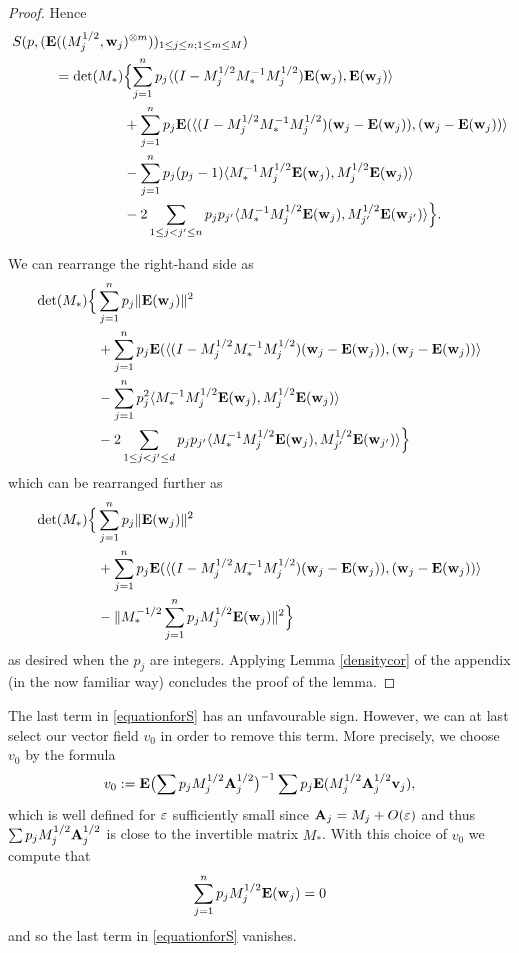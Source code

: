 \begin{proof}
Hence
\begin{eqnarray*}
\begin{aligned}
S(p, ({\hbox{\bf E}}( (M_j^{1/2}, {\hbox{\bf w}}_j&)^{\otimes m} ))_{1 \leq j
\leq n; 1 \leq m \leq M} )\\
= \det (M_*) &\Bigl\{ \sum_{j=1}^n p_j\langle
(I-M_j^{1/2}M_{*}^{-1}M_{j}^{1/2}) {\hbox{\bf E}}({\hbox{\bf w}}_j), {\hbox{\bf E}}({\hbox{\bf w}}_j)
\rangle\\
&+ \sum_{j=1}^n p_j {\hbox{\bf E}}(\langle (I-M_j^{1/2} M_* ^{-1}
M_j^{1/2})({\hbox{\bf w}}_j - {\hbox{\bf E}}({\hbox{\bf w}}_j)),
({\hbox{\bf w}}_j - {\hbox{\bf E}}({\hbox{\bf w}}_j)) \rangle\\
&-\sum_{j=1}^{n}p_{j}(p_{j}-1)\langle M_*^{-1}M_j^{1/2}{\hbox{\bf E}}({\hbox{\bf w}}_j), M_j^{1/2} {\hbox{\bf E}}({\hbox{\bf w}}_j) \rangle\\
&- 2\sum_{1 \leq j < j' \leq n} p_{j}p_{j'}\langle
M_*^{-1}M_j^{1/2}{\hbox{\bf E}}({\hbox{\bf w}}_j),
M_{j'}^{1/2} {\hbox{\bf E}}({\hbox{\bf w}}_{j'}) \rangle\Bigr\}.
\end{aligned}
\end{eqnarray*}

We can rearrange the right-hand side as
\begin{eqnarray*}
\begin{aligned}
\det (M_*) \Bigl\{&\sum_{j=1}^n p_{j}\|{\hbox{\bf E}}({\hbox{\bf w}}_j)\|^2 \\&+
\sum_{j=1}^n p_j {\hbox{\bf E}}(\langle (I-M_j^{1/2} M_* ^{-1} M_j^{1/2})
({\hbox{\bf w}}_j - {\hbox{\bf E}}({\hbox{\bf w}}_j)),
({\hbox{\bf w}}_j - {\hbox{\bf E}}({\hbox{\bf w}}_j)) \rangle\\
&-\sum_{j=1}^{n}p_{j}^2\langle M_*^{-1}M_j^{1/2} {\hbox{\bf E}}({\hbox{\bf w}}_j),
M_j^{1/2}{\hbox{\bf E}}({\hbox{\bf w}}_j)
\rangle\\
&- 2\sum_{1 \leq j < j' \leq d} p_{j}p_{j'}\langle
M_*^{-1}M_j^{1/2}{\hbox{\bf E}}({\hbox{\bf w}}_j),
M_{j'}^{1/2} {\hbox{\bf E}}({\hbox{\bf w}}_{j'}) \rangle \Bigr\}
\end{aligned}
\end{eqnarray*}
which can be rearranged further as
\begin{align*}
\det (M_*) \Bigl\{&\sum_{j=1}^n p_{j}\|{\hbox{\bf E}}({\hbox{\bf w}}_j)\|^2 \\&+
\sum_{j=1}^n p_j {\hbox{\bf E}}(\langle (I-M_j^{1/2} M_* ^{-1} M_j^{1/2})({\hbox{\bf w}}_j
- {\hbox{\bf E}}({\hbox{\bf w}}_j)),
({\hbox{\bf w}}_j - {\hbox{\bf E}}({\hbox{\bf w}}_j)) \rangle\\
&-\| M_*^{-1/2}\sum_{j=1}^n p_{j}M_j^{1/2} {\hbox{\bf E}}({\hbox{\bf w}}_j) \|^2 \Bigr\}
\end{align*}
as desired when the $p_j$ are integers. Applying Lemma
\ref{densitycor} of the appendix (in the now familiar way)
concludes the proof of the lemma.
\end{proof}

The last term in \eqref{equationforS} has an unfavourable sign.
However, we can at last select our vector field $v_0$ in order to remove this term.
More precisely, we choose $v_0$ by the formula
$$v_{0} := {\hbox{\bf E}}\bigl(\sum p_jM_j^{1/2}{\hbox{\bf A}}_{j}^{1/2}\bigr)^{-1}
\sum p_{j}{\hbox{\bf E}}(M_{j}^{1/2}{\hbox{\bf A}}_{j}^{1/2}{\hbox{\bf v}}_{j}),$$
which is well defined for $\varepsilon$ sufficiently small since ${\hbox{\bf A}}_j = M_j + O(\varepsilon)$ and
thus $\sum p_jM_j^{1/2}{\hbox{\bf A}}_{j}^{1/2}$ is close to the invertible matrix $M_*$.  With this choice of $v_0$
we compute that
$$ \sum_{j=1}^n p_{j}M_j^{1/2} {\hbox{\bf E}}({\hbox{\bf w}}_j) = 0$$
and so the last term in \eqref{equationforS} vanishes.

